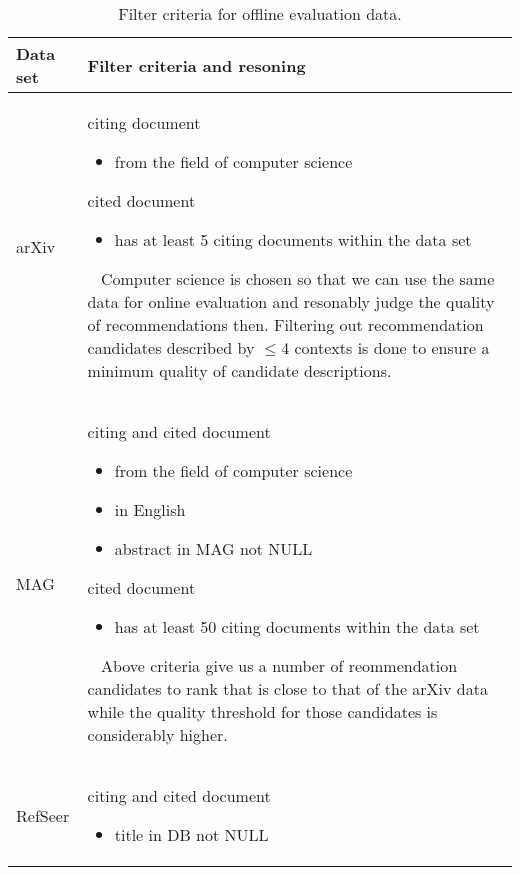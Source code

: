 \begin{table}[]
\centering
    \caption{Filter criteria for offline evaluation data.}
    \label{tab:datasetfilter}
\begin{center}
    \begin{tabular}{lp{11.5cm}}
    \toprule
    Data set & Filter criteria and resoning\\
    \midrule
    arXiv & citing document
            \begin{itemize}
                \item from the field of computer science
            \end{itemize}
            cited document
            \begin{itemize}
                \item has at least 5 citing documents within the data set
            \end{itemize}
            \ 
            \newline
            Computer science is chosen so that we can use the same data for online evaluation and resonably judge the quality of recommendations then.
            \newline
            Filtering out recommendation candidates described by $\le$4 contexts is done to ensure a minimum quality of candidate descriptions.\\
    \midrule
    MAG & citing and cited document
            \begin{itemize}
                \item from the field of computer science
                \item in English
                \item abstract in MAG not NULL
            \end{itemize}
            cited document
            \begin{itemize}
                \item has at least 50 citing documents within the data set
            \end{itemize}
            \ 
            \newline
            Above criteria give us a number of reommendation candidates to rank that is close to that of the arXiv data while the quality threshold for those candidates is considerably higher.\\
    \midrule
    RefSeer & citing and cited document
            \begin{itemize}
                \item title in DB not NULL

\end{itemize}
\end{tabular}
\end{center}
\end{table}
